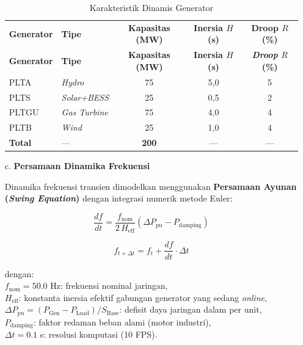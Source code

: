 \begin{enumerate}
\begin{longtable}{|l|l|c|c|c|}
    \caption{Karakteristik Dinamis Generator}
    \label{tab:gen_overview}
    \vspace{-0.75em}\\
    \hline
    \textbf{Generator} & \textbf{Tipe} & \textbf{Kapasitas (MW)} & \textbf{Inersia $H$ (s)} & \textbf{Droop $R$ (\%)} \\ \hline
    \endfirsthead
    \hline
    \textbf{Generator} & \textbf{Tipe} & \textbf{Kapasitas (MW)} & \textbf{Inersia $H$ (s)} & \textbf{\textit{Droop} $R$ (\%)} \\ \hline
    \endhead
    PLTA  & \textit{Hydro}       & 75            & 5,0          & 5 \\ \hline
    PLTS  & \textit{Solar+BESS}  & 25            & 0,5          & 2 \\ \hline
    PLTGU & \textit{Gas Turbine} & 75            & 4,0          & 4 \\ \hline
    PLTB  & \textit{Wind}        & 25            & 1,0          & 4 \\ \hline
    \textbf{Total} & --- & \textbf{200} & ---          & --- \\ \hline
\end{longtable}

\item[c.] \textbf{Persamaan Dinamika Frekuensi}

Dinamika frekuensi transien dimodelkan menggunakan \textbf{Persamaan Ayunan (\textit{Swing Equation})} dengan integrasi numerik metode Euler:

\begin{equation}
    \frac{df}{dt} = \frac{f_{\mathrm{nom}}}{2\,H_{\mathrm{eff}}}
    \left(\Delta P_{\mathrm{pu}} - P_{\mathrm{damping}}\right)
    \label{eq:swing}
\end{equation}

\begin{equation}
    f_{t+\Delta t} = f_{t} + \frac{df}{dt} \cdot \Delta t
    \label{eq:euler}
\end{equation}

\noindent dengan:\\
$f_{\mathrm{nom}} = 50{.}0$ Hz: frekuensi nominal jaringan,\\
$H_{\mathrm{eff}}$: konstanta inersia efektif gabungan generator yang sedang \textit{online},\\
$\Delta P_{\mathrm{pu}} = (P_{\mathrm{Gen}} - P_{\mathrm{Load}}) / S_{\mathrm{Base}}$: defisit daya jaringan dalam per unit,\\
$P_{\mathrm{damping}}$: faktor redaman beban alami (motor industri),\\
$\Delta t = 0{.}1$ s: resolusi komputasi (10 FPS).\\


\end{enumerate}
